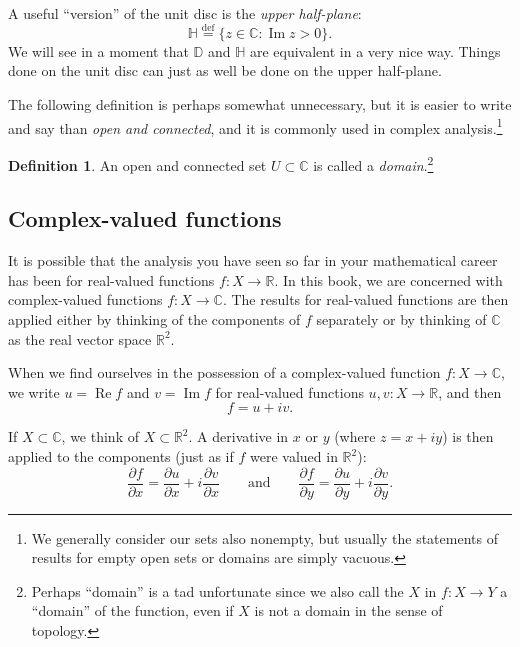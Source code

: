 \documentclass[12pt,openany]{book}
\newcommand{\glsadd}[2][]{}
\renewcommand{\Re}{\operatorname{Re}}
\renewcommand{\Im}{\operatorname{Im}}
\newcommand{\C}{{\mathbb{C}}}
\newcommand{\R}{{\mathbb{R}}}
\newcommand{\D}{{\mathbb{D}}}
\newcommand{\bH}{{\mathbb{H}}}
\newcommand{\myindex}[1]{#1\index{#1}}
\newcommand{\myquote}[1]{``#1''}
\theoremstyle{plain}
\theoremstyle{remark}
\theoremstyle{definition}
\newtheorem{defn}[thm]{Definition}
\theoremstyle{exercise}
\theoremstyle{example}
\begin{document}
A useful \myquote{version} of the unit disc is the \emph{\myindex{upper half-plane}}:
\glsadd{not:H}%
\begin{equation*}
\bH 
\overset{\text{def}}{=}
\bigl\{
z \in \C : \Im z > 0
\bigr\} .
\end{equation*}
We will see in a moment that $\D$ and $\bH$ are equivalent in a
very nice way.
Things done on the unit disc can just as well be done on the upper half-plane.

The following definition is perhaps somewhat unnecessary, but it is 
easier to write and say than \emph{open and connected}, and it is commonly
used in complex analysis.\footnote{We generally consider our sets
also nonempty, but usually the statements of results for empty open sets or
domains are simply vacuous.}

\begin{defn}
An open and connected set $U \subset \C$ is called a
\emph{\myindex{domain}}.\footnote{Perhaps \myquote{domain} is a tad unfortunate since
we also call the $X$ in $f \colon X \to Y$ a \myquote{domain} of the function,
even if $X$ is not a domain in the sense of topology.}
\end{defn}

\subsection{Complex-valued functions}

It is possible that the analysis you have seen so far in your mathematical
career has been for real-valued functions $f \colon X \to \R$.  In this
book, we are concerned with complex-valued functions $f \colon X \to \C$.
The results for real-valued functions are then applied either by thinking of
the components of $f$ separately or by thinking of $\C$ as the
real vector space $\R^2$.

When we find ourselves in the possession of a complex-valued function
$f \colon X \to \C$, we write $u = \Re f$
and $v = \Im f$ for real-valued functions $u,v \colon X \to \R$, and then
\begin{equation*}
f = u+iv .
\end{equation*}

If $X \subset \C$, we think of $X \subset \R^2$.
A derivative in $x$ or $y$ (where $z=x+iy$) is then applied to the
components (just as if $f$ were valued in $\R^2$):
\begin{equation*}
\frac{\partial f}{\partial x} = 
\frac{\partial u}{\partial x} + i
\frac{\partial v}{\partial x}
\qquad\text{and}\qquad
\frac{\partial f}{\partial y} = 
\frac{\partial u}{\partial y} + i
\frac{\partial v}{\partial y} .
\end{equation*}
\end{document}
